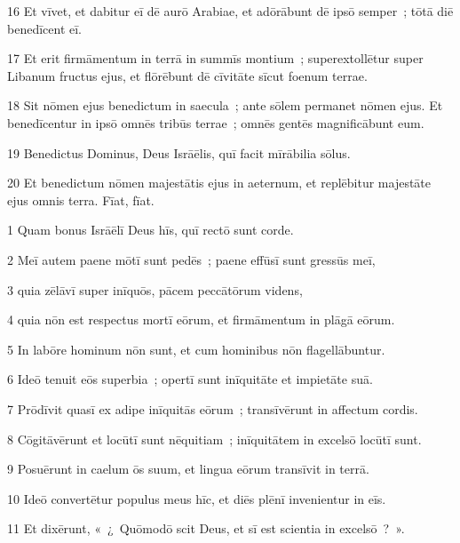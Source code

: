 \psalmVerse
  {\phantom{0}16}
  {Et vīvet, et dabitur eī dē aurō Arabiae, et adōrābunt dē ipsō semper~; tōtā diē benedīcent eī.}


\psalmVerse
  {\phantom{0}17}
  {Et erit firmāmentum in terrā in summīs montium~; superextollētur super Libanum fructus ejus, et flōrēbunt dē cīvitāte sīcut foenum terrae.}


\psalmVerse
  {\phantom{0}18}
  {Sit nōmen ejus benedictum in saecula~; ante sōlem permanet nōmen ejus. Et benedīcentur in ipsō omnēs tribūs terrae~; omnēs gentēs magnificābunt eum.}


\psalmVerse
  {\phantom{0}19}
  {Benedictus Dominus, Deus Isrāēlis, quī facit mīrābilia sōlus.}


\psalmVerse
  {\phantom{0}20}
  {Et benedictum nōmen majestātis ejus in aeternum, et replēbitur majestāte ejus omnis terra. Fīat, fīat.}




\psalmVerse
  {\phantom{00}1}
  {Quam bonus Isrāēlī Deus hīs, quī rectō sunt corde.}


\psalmVerse
  {\phantom{00}2}
  {Meī autem paene mōtī sunt pedēs~; paene effūsī sunt gressūs meī,}


\psalmVerse
  {\phantom{00}3}
  {quia zēlāvī super inīquōs, pācem peccātōrum videns,}


\psalmVerse
  {\phantom{00}4}
  {quia nōn est respectus mortī eōrum, et firmāmentum in plāgā eōrum.}


\psalmVerse
  {\phantom{00}5}
  {In labōre hominum nōn sunt, et cum hominibus nōn flagellābuntur.}


\psalmVerse
  {\phantom{00}6}
  {Ideō tenuit eōs superbia~; opertī sunt inīquitāte et impietāte suā.}


\psalmVerse
  {\phantom{00}7}
  {Prōdīvit quasī ex adipe inīquitās eōrum~; transīvērunt in affectum cordis.}


\psalmVerse
  {\phantom{00}8}
  {Cōgitāvērunt et locūtī sunt nēquitiam~; inīquitātem in excelsō locūtī sunt.}


\psalmVerse
  {\phantom{00}9}
  {Posuērunt in caelum ōs suum, et lingua eōrum transīvit in terrā.}


\psalmVerse
  {\phantom{0}10}
  {Ideō convertētur populus meus hīc, et diēs plēnī invenientur in eīs.}


\psalmVerse
  {\phantom{0}11}
  {Et dixērunt, «~¿~Quōmodō scit Deus, et sī est scientia in excelsō~?~».}


